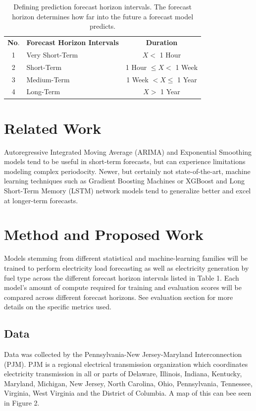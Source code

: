 \documentclass[sigconf]{acmart}
\begin{document}
\begin{table}
\centering
\caption{Defining prediction forecast horizon intervals. The forecast horizon determines how far into the future a forecast model predicts.}
\begin{tabular}{clc}
\toprule
\hfill \textbf{No}. & \hfil \textbf{Forecast Horizon Intervals} & \textbf{Duration}\\
\cmidrule(lr){1-1}\cmidrule(rl){2-2}\cmidrule(rl){3-3}
  1 & Very Short-Term & $ X < $ 1 Hour \\
  2 & Short-Term  & 1 Hour $ \leq X < $ 1 Week  \\   
  3 & Medium-Term & 1 Week $ < X \leq $ 1 Year  \\   
  4 & Long-Term & $ X > $ 1 Year  \\ 
  \bottomrule
\end{tabular}
\end{table}

\section{Related Work}
Autoregressive Integrated Moving Average (ARIMA) and Exponential Smoothing models tend to be useful in short-term forecasts, but can experience limitations modeling complex periodocity. Newer, but certainly not state-of-the-art, machine learning techniques such as Gradient Boosting Machines or XGBoost and Long Short-Term Memory (LSTM) network models tend to generalize better and excel at longer-term forecasts.

\section{Method and Proposed Work}
Models stemming from different statistical and machine-learning families will be trained to perform electricity load forecasting as well as electricity generation by fuel type across the different forecast horizon intervals listed in Table 1. Each model's amount of compute required for training and evaluation scores will be compared across different forecast horizons. See evaluation section for more details on the specific metrics used.

  \subsection{Data}
  Data was collected by the Pennsylvania-New Jersey-Maryland Interconnection (PJM). PJM is a regional electrical transmission organization which coordinates electricity transmission in all or parts of Delaware, Illinois, Indiana, Kentucky, Maryland, Michigan, New Jersey, North Carolina, Ohio, Pennsylvania, Tennessee, Virginia, West Virginia and the District of Columbia.\cite{PJMZone24} A map of this can bee seen in Figure 2.
  
\end{document}

